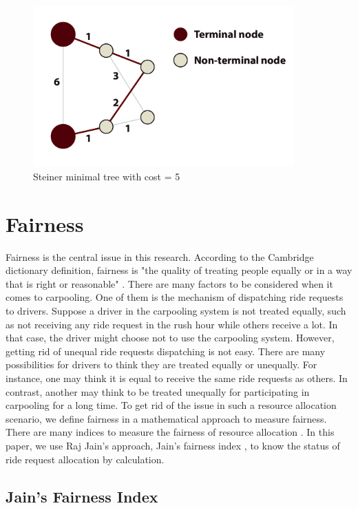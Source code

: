 \begin{figure}[htp]
  \centering
  \captionsetup{justification=centering}
  \includegraphics[width=10cm]{figures/steiner_2.jpg}
  \caption{Steiner minimal tree with cost = 5}
\end{figure}

\section{Fairness}

Fairness is the central issue in this research. According to the Cambridge dictionary definition, fairness is "the quality of treating people equally or in a way that is right or reasonable" \cite{noauthor_fairness_nodate}. There are many factors to be considered when it comes to carpooling. One of them is the mechanism of dispatching ride requests to drivers. Suppose a driver in the carpooling system is not treated equally, such as not receiving any ride request in the rush hour while others receive a lot. In that case, the driver might choose not to use the carpooling system. However, getting rid of unequal ride requests dispatching is not easy. There are many possibilities for drivers to think they are treated equally or unequally. For instance, one may think it is equal to receive the same ride requests as others. In contrast, another may think to be treated unequally for participating in carpooling for a long time. To get rid of the issue in such a resource allocation scenario, we define fairness in a mathematical approach to measure fairness. There are many indices to measure the fairness of resource allocation \cite{jain_990045_nodate}. In this paper, we use Raj Jain's approach, Jain's fairness index \cite{jain_quantitative_1998}, to know the status of ride request allocation by calculation.

\subsection{Jain's Fairness Index}

